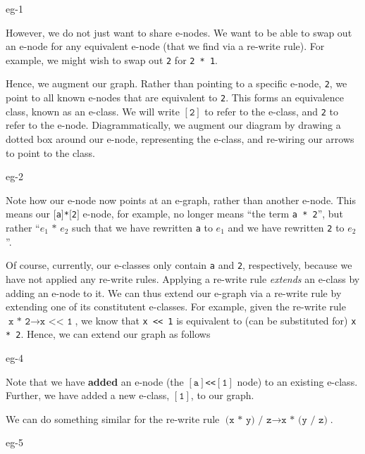 \begin{center}
    {eg-1}
\end{center}

However, we do not just want to share e-nodes. We want to be able to swap out an e-node for any equivalent e-node (that we find via a re-write rule). 
For example, we might wish to swap out \texttt{2} for \texttt{2 * 1}. 

Hence, we augment our graph. Rather than pointing to a specific e-node, \texttt{2}, we point to all known e-nodes that are equivalent to \texttt{2}.
This forms an equivalence class, known as an e-class. We will write $[\texttt{2}]$ to refer to the e-class, and \texttt{2} to refer to the e-node. 
Diagrammatically, we augment our diagram by drawing a dotted box around our e-node, representing the e-class, and re-wiring
our arrows to point to the class. 

\begin{center}
  {eg-2}
\end{center}

Note how our e-node now points at an e-graph, rather than another e-node. This means our \texttt{$[$a$]$*$[$2$]$} e-node, for example, no longer means 
``the term \texttt{a * 2}'', but rather ``$e_1 \texttt{ * } e_2$ such that we have rewritten \texttt{a} to $e_1$ and  we have rewritten \texttt{2} to $e_2$''.

Of course, currently, our e-classes only contain \texttt{a} and \texttt{2}, respectively, because we have not applied any re-write rules. 
Applying a re-write rule \textit{extends} an e-class by adding an e-node to it. 
We can thus extend our e-graph via a re-write rule by extending one of its constitutent e-classes. 
For example, given the re-write rule $\texttt{x * 2} \to \texttt{x << 1}$, 
we know that \texttt{x << 1} is equivalent to (can be substituted for) \texttt{x * 2}. Hence, we can extend our graph as follows

\begin{center}
  {eg-4}
\end{center}

Note that we have \textbf{added} an e-node (the \texttt{$[\texttt{a}]$<<$[\texttt{1}]$} node) to an existing e-class. 
Further, we have added a new e-class, $[\texttt{1}]$, to our graph.

We can do something similar for the re-write rule $\texttt{(x * y) / z} \to \texttt{x * (y / z)}$.
\begin{center}
  {eg-5}
\end{center}

